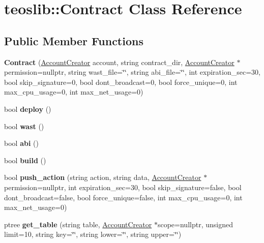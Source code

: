\hypertarget{classteoslib_1_1_contract}{}\section{teoslib\+:\+:Contract Class Reference}
\label{classteoslib_1_1_contract}
\subsection*{Public Member Functions}
\begin{DoxyCompactItemize}
\item 
\mbox{\label{classteoslib_1_1_contract_af758234b7b1ed7dc21154b4d03041133}} 
{\bfseries Contract} (\mbox{\hyperlink{classteoslib_1_1_account_creator}{Account\+Creator}} account, string contract\+\_\+dir, \mbox{\hyperlink{classteoslib_1_1_account_creator}{Account\+Creator}} $\ast$permission=nullptr, string wast\+\_\+file=\char`\"{}\char`\"{}, string abi\+\_\+file=\char`\"{}\char`\"{}, int expiration\+\_\+sec=30, bool skip\+\_\+signature=0, bool dont\+\_\+broadcast=0, bool force\+\_\+unique=0, int max\+\_\+cpu\+\_\+usage=0, int max\+\_\+net\+\_\+usage=0)
\item 
\mbox{\label{classteoslib_1_1_contract_a36871573d5f0d1dadcbfdd25bdea7841}} 
bool {\bfseries deploy} ()
\item 
\mbox{\label{classteoslib_1_1_contract_aa0b3c3aff9940764f4da23ecac06767e}} 
bool {\bfseries wast} ()
\item 
\mbox{\label{classteoslib_1_1_contract_a2b07cac5c77d96da0ccc34afe42845f1}} 
bool {\bfseries abi} ()
\item 
\mbox{\label{classteoslib_1_1_contract_aff0501fafceee522615252539ce7d7b2}} 
bool {\bfseries build} ()
\item 
\mbox{\label{classteoslib_1_1_contract_ab32d4607849e99e51ed73c0c7bae42f0}} 
bool {\bfseries push\+\_\+action} (string action, string data, \mbox{\hyperlink{classteoslib_1_1_account_creator}{Account\+Creator}} $\ast$permission=nullptr, int expiration\+\_\+sec=30, bool skip\+\_\+signature=false, bool dont\+\_\+broadcast=false, bool force\+\_\+unique=false, int max\+\_\+cpu\+\_\+usage=0, int max\+\_\+net\+\_\+usage=0)
\item 
\mbox{\label{classteoslib_1_1_contract_a79dcecbf3957d80073d643e9ca5bdf64}} 
ptree {\bfseries get\+\_\+table} (string table, \mbox{\hyperlink{classteoslib_1_1_account_creator}{Account\+Creator}} $\ast$scope=nullptr, unsigned limit=10, string key=\char`\"{}\char`\"{}, string lower=\char`\"{}\char`\"{}, string upper=\char`\"{}\char`\"{})
\end{DoxyCompactItemize}
